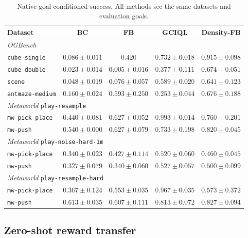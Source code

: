 \documentclass[11pt]{article}
\begin{document}
\begin{table}[h]
    \centering
    \setlength{\tabcolsep}{5pt}
    \begin{tabular}{l cccc}
    \toprule
    Dataset & BC & FB & GCIQL & Density-FB \\
    \midrule
    \multicolumn{5}{l}{\emph{OGBench}}\\
    \texttt{cube-single} & $0.086\pm0.011$ & $0.420$ & $0.732\pm0.018$ & $\mathbf{0.915\pm0.098}$ \\
    \texttt{cube-double} & $0.023\pm0.014$ & $0.005\pm0.016$ & $0.377\pm0.111$ & $\mathbf{0.674\pm0.051}$ \\
    \texttt{scene} & $0.048\pm0.019$ & $0.076\pm0.057$ & $0.589\pm0.020$ & $\mathbf{0.641\pm0.123}$ \\
    \texttt{antmaze-medium} & $0.160\pm0.024$ & $0.593\pm0.250$ & $0.253\pm0.044$ & $\mathbf{0.676\pm0.188}$ \\
    \midrule
    \multicolumn{5}{l}{\emph{Metaworld} \texttt{play-resample}}\\
    \texttt{mw-pick-place} & $0.440\pm0.081$ & $0.627\pm0.052$ & $\mathbf{0.993\pm0.014}$ & $0.760\pm0.201$ \\
    \texttt{mw-push} & $0.540\pm0.000$ & $0.627\pm0.079$ & $0.733\pm0.198$ & $\mathbf{0.820\pm0.045}$ \\
    \midrule
    \multicolumn{5}{l}{\emph{Metaworld} \texttt{play-noise-hard-1m}}\\
    \texttt{mw-pick-place} & $0.340\pm0.023$ & $0.427\pm0.114$ & $\mathbf{0.520\pm0.060}$ & $0.460\pm0.045$ \\
    \texttt{mw-push} & $0.327\pm0.079$ & $0.340\pm0.060$ & $\mathbf{0.527\pm0.057}$ & $0.500\pm0.099$ \\
    \midrule
    \multicolumn{5}{l}{\emph{Metaworld} \texttt{play-resample-hard}}\\
    \texttt{mw-pick-place} & $0.367\pm0.124$ & $0.553\pm0.035$ & $\mathbf{0.967\pm0.035}$ & $0.573\pm0.372$ \\
    \texttt{mw-push} & $0.613\pm0.035$ & $0.607\pm0.111$ & $0.813\pm0.072$ & $\mathbf{0.827\pm0.094}$ \\
    \bottomrule
    \end{tabular}
    \caption{Native goal-conditioned success. All methods see the same datasets and evaluation goals.}
    \label{tab:main}
\end{table}


\subsection{Zero-shot reward transfer}
\end{document}
